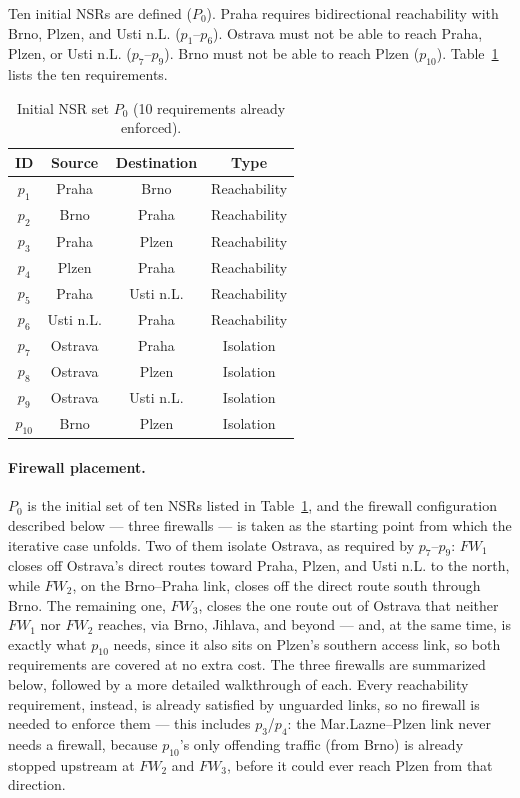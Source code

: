 Ten initial NSRs are defined ($P_0$). Praha requires bidirectional reachability with Brno, Plzen, and Usti n.L. ($p_1$--$p_6$). Ostrava must not be able to reach Praha, Plzen, or Usti n.L. ($p_7$--$p_9$). Brno must not be able to reach Plzen ($p_{10}$). Table~\ref{tab:cesnet-initial} lists the ten requirements.

\begin{table}[H]
\centering
\caption{Initial NSR set $P_0$ (10 requirements already enforced).}
\label{tab:cesnet-initial}
\begin{tabular}{cccc}
\hline
\textbf{ID} & \textbf{Source} & \textbf{Destination} & \textbf{Type} \\
\hline
$p_1$    & Praha   & Brno    & Reachability \\
$p_2$    & Brno    & Praha   & Reachability \\
$p_3$    & Praha   & Plzen   & Reachability \\
$p_4$    & Plzen   & Praha   & Reachability \\
$p_5$    & Praha   & Usti n.L. & Reachability \\
$p_6$    & Usti n.L. & Praha   & Reachability \\
$p_7$    & Ostrava & Praha   & Isolation \\
$p_8$    & Ostrava & Plzen   & Isolation \\
$p_9$    & Ostrava & Usti n.L. & Isolation \\
$p_{10}$ & Brno    & Plzen   & Isolation \\
\hline
\end{tabular}
\end{table}

\paragraph{Firewall placement.}

$P_0$ is the initial set of ten NSRs listed in Table~\ref{tab:cesnet-initial}, and the firewall configuration described below — three firewalls — is taken as the starting point from which the iterative case unfolds. Two of them isolate Ostrava, as required by $p_7$--$p_9$: $\mathit{FW}_1$ closes off Ostrava's direct routes toward Praha, Plzen, and Usti n.L. to the north, while $\mathit{FW}_2$, on the Brno--Praha link, closes off the direct route south through Brno. The remaining one, $\mathit{FW}_3$, closes the one route out of Ostrava that neither $\mathit{FW}_1$ nor $\mathit{FW}_2$ reaches, via Brno, Jihlava, and beyond — and, at the same time, is exactly what $p_{10}$ needs, since it also sits on Plzen's southern access link, so both requirements are covered at no extra cost. The three firewalls are summarized below, followed by a more detailed walkthrough of each. Every reachability requirement, instead, is already satisfied by unguarded links, so no firewall is needed to enforce them — this includes $p_3$/$p_4$: the Mar.Lazne--Plzen link never needs a firewall, because $p_{10}$'s only offending traffic (from Brno) is already stopped upstream at $\mathit{FW}_2$ and $\mathit{FW}_3$, before it could ever reach Plzen from that direction.

